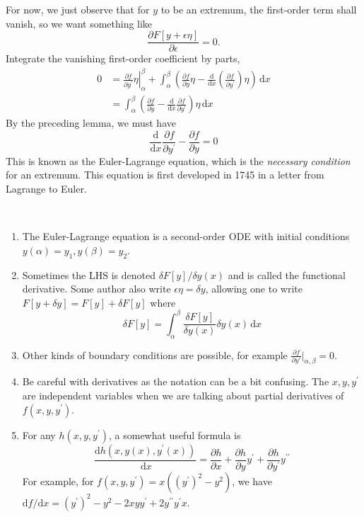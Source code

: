 \documentclass[a4paper]{article}
\begin{document}
For now, we just observe that for $y$ to be an extremum, the first-order term shall vanish, so we want something like 
\[
    \frac{\partial F[y+\epsilon \eta]}{\partial \epsilon} =0.
\]
Integrate the vanishing first-order coefficient by parts,
\begin{align*}
    0&=\left.\frac{\partial f}{\partial y^\prime}\eta\right|_\alpha^\beta+\int_\alpha^\beta\left( \frac{\partial f}{\partial y}\eta-\frac{\mathrm d}{\mathrm dx}\left( \frac{\partial f}{\partial y^\prime} \right)\eta \right)\,\mathrm dx\\
    &=\int_\alpha^\beta\left( \frac{\partial f}{\partial y}-\frac{\mathrm d}{\mathrm dx}\frac{\partial f}{\partial y^\prime} \right)\eta\,\mathrm dx
\end{align*}
By the preceding lemma, we must have
$$\boxed{\frac{\mathrm d}{\mathrm dx}\frac{\partial f}{\partial y^\prime}-\frac{\partial f}{\partial y}=0}$$
This is known as the Euler-Lagrange equation, which is the \textit{necessary condition} for an extremum. This equation is first developed in 1745 in a letter from Lagrange to Euler.
\begin{remark}\ 
    \begin{enumerate}
        \item The Euler-Lagrange equation is a second-order ODE with initial conditions $y(\alpha)=y_1,y(\beta)=y_2$.
        \item Sometimes the LHS is denoted $\delta F[y]/\delta y(x)$ and is called the functional derivative.
        Some author also write $\epsilon\eta=\delta y$, allowing one to write $F[y+\delta y]=F[y]+\delta F[y]$ where
        $$\delta F[y]=\int_\alpha^\beta\frac{\delta F[y]}{\delta y(x)}\delta y(x)\,\mathrm dx$$
        \item Other kinds of boundary conditions are possible, for example $ \frac{\partial f}{\partial y'}\Big|_{\alpha,\beta}=0  $.
        \item Be careful with derivatives as the notation can be a bit confusing.
        The $x,y,y^\prime$ are independent variables when we are talking about partial derivatives of $f(x,y,y^\prime)$.
        \item For any $h(x,y,y^\prime)$, a somewhat useful formula is
        $$\frac{\mathrm dh(x,y(x),y^\prime(x))}{\,\mathrm dx}=\frac{\partial h}{\partial x}+\frac{\partial h}{\partial y}y^\prime+\frac{\partial h}{\partial y^\prime}y^{\prime\prime}$$
        For example, for $f(x,y,y^\prime)=x((y^\prime)^2-y^2)$, we have $\mathrm df/\mathrm dx=(y^\prime)^2-y^2-2xyy^\prime+2y^{\prime\prime}y^\prime x$.
    \end{enumerate}
\end{remark}
\end{document}
